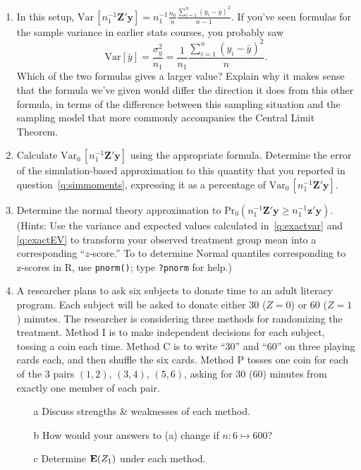 \documentclass{article}
\begin{document}
\begin{enumerate}
\item In this setup, $\mathrm{Var}\, [n_{1}^{-1}\mathbf{Z}'\mathbf{y}]  = n_{1}^{-1}
  \frac{n_{0}}{n} \frac{\sum_{i=1}^{n} (y_{i} - \bar y)^{2}}{n-1} $.
  If you've seen formulas for the sample variance in earlier stats
  courses, you probably saw
  $$
  \mathrm{Var} \left[\bar{y}\right] = \frac{\sigma_{y}^{2}}{n_{1}} = \frac{1}{n_{1}}
  \frac{\sum_{i=1}^{n} (y_{i} - \bar y)^{2}}{n} .
  $$
Which of the two formulas gives a larger value?  Explain why it makes
sense that the formula we've given would differ the direction it does
from this other formula, in terms of the difference between this
sampling situation and the sampling model that more commonly
accompanies the Central Limit Theorem.
\item Calculate $\mathrm{Var}_{0}\, [n_{1}^{-1}\mathbf{Z}'\mathbf{y}]$ using the appropriate
  formula.   Determine the error of the simulation-based
  approximation to this quantity that you reported in question~\ref{q:simmoments},
  expressing it as a percentage of $\mathrm{Var}_{0}\,[ n_{1}^{-1}\mathbf{Z}'\mathbf{y}]$. \label{q:exactvar}
\item Determine the normal theory approximation to
  $\mathrm{Pr}_{0}(n_{1}^{-1}\mathbf{Z}'\mathbf{y} \geq
  n_{1}^{-1}\mathbf{z}'\mathbf{y} ) $.  (Hints: Use the variance and
  expected values calculated in~\ref{q:exactvar} and \ref{q:exactEV} to transform your
  observed treatment group mean into a corresponding ``$z$-score.'' 
  To to determine Normal quantiles corresponding to z-scores in R, use
  \texttt{pnorm()}; type \texttt{?pnorm} for help.)
\item %
A researcher plans to ask six subjects to donate time to an adult
literacy program. Each subject will be asked to donate either 30
($Z=0$) or 60 ($Z=1$)
minutes. The researcher is considering three methods for randomizing
the treatment. Method I is to make independent decisions for each
subject, tossing a coin each time. Method C is to
write ``30'' and ``60'' on three playing cards each, and then shuffle
the six cards. Method P tosses one coin for each of the 3 pairs
$(1,2)$, $(3,4)$, $(5,6)$, asking for 30 (60) minutes from exactly one
member of each pair. 
  \begin{minipage}{.45\linewidth}
\begin{itemize}
\item[a] Discuss strengths \& weaknesses of each method.
\item[b] How would your answers to (a) change if $n: 6 \mapsto 600$?
\item[c] Determine $\mathbf{E}(  Z_{1} )$  under each method.

\end{itemize}
\end{minipage}
\end{enumerate}
\end{document}
